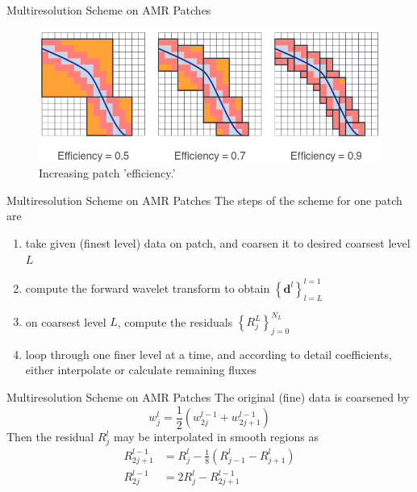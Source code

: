 \documentclass{beamer}
\begin{document}
\begin{frame}[center]{Multiresolution Scheme on AMR Patches}
	\begin{figure}
		\center
		\includegraphics[scale=0.5]{plots/patch-efficiency.png}
		\caption{Increasing patch 'efficiency.'}
	\end{figure}
\end{frame}

\begin{frame}[center]{Multiresolution Scheme on AMR Patches}
      The steps of the scheme for one patch are
      \begin{enumerate}
        \item take given (finest level) data on patch, and coarsen it to desired coarsest level $L$
        \item compute the forward wavelet transform to obtain $\left\{ \mathbf{d}^{l}\right\}_{l=L}^{l=1}$
        \item on coarsest level $L$, compute the residuals $\left\{ R_{j}^{L} \right\}_{j=0}^{N_{L}}$
        \item loop through one finer level at a time, and according to detail coefficients,
              either interpolate or calculate remaining fluxes
      \end{enumerate}
\end{frame}

\begin{frame}[center]{Multiresolution Scheme on AMR Patches}
  The original (fine) data is coarsened by
      \begin{equation*}
        w_{j}^{l} = \frac{1}{2} \left( w_{2j}^{l-1} + w_{2j+1}^{l-1} \right)
      \end{equation*}
      Then the residual $R_{j}^{l}$ may be interpolated in smooth regions as
      \begin{align*}
        R^{l-1}_{2j+1} & = R^{l}_{j} - \frac{1}{8} \left( R^{l}_{j-1} - R^{l}_{j+1} \right) \\
        R^{l-1}_{2j} & = 2 R^{l}_{j} - R^{l-1}_{2j+1}
      \end{align*}
\end{frame}
\end{document}
